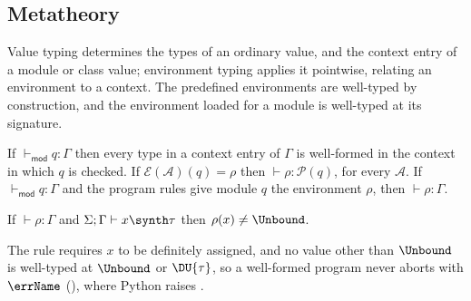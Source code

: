 \subsection{Metatheory}
\label{sec:metatheory}

Value typing determines the types of an ordinary value, and the context entry of a module or class value;
environment typing applies it pointwise, relating an environment to a context. The predefined environments are
well-typed by construction, and the environment loaded for a module is well-typed at its signature.

\begin{theorem}
\label{thm:loaded}
If $\vdash_{\mathsf{mod}} q : \Gamma$ then every type in a context entry of $\Gamma$ is well-formed in the
context in which $q$ is checked.
If $\mathcal{E}(\mathcal{A})(q) = \rho$ then $\vdash \rho : \mathcal{P}(q)$, for every $\mathcal{A}$.
If $\vdash_{\mathsf{mod}} q : \Gamma$ and the program rules give module $q$ the environment $\rho$, then $\vdash \rho : \Gamma$.
\end{theorem}

\begin{lemma}
\label{lem:variables-bound}
If $\vdash \rho : \Gamma$ and $\Sigma; \Gamma \vdash x \synth \tau$ then $\rho(x) \neq \Unbound$.
\end{lemma}

\noindent The  rule requires $x$ to be definitely assigned, and no value other than $\Unbound$ is well-typed at $\Unbound$ or $\DU{\tau}$, so a well-formed program never aborts with $\errName$ (), where Python raises
.




